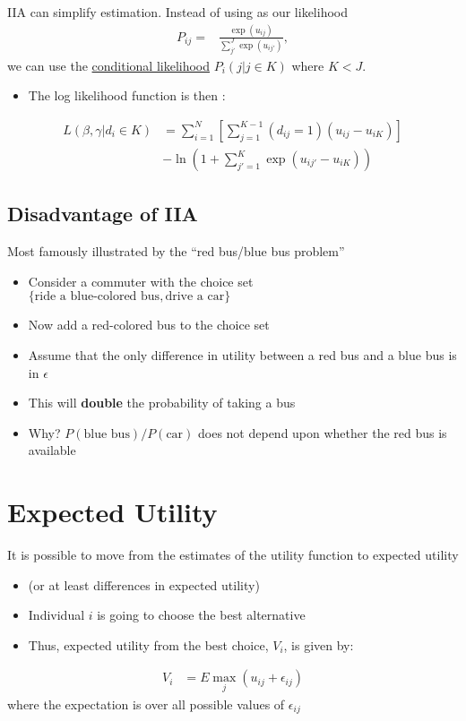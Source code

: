 \documentclass[11pt]{article}
\begin{document}
IIA can simplify estimation. Instead of using as our likelihood
\begin{align}
P_{ij}=&\frac{\exp(u_{ij})}{\sum_{j'}^J\exp(u_{ij'})},
\end{align}
we can use the \uline{conditional likelihood} \(P_i(j|j\in K)\) where \(K<J\).  

\begin{itemize}
\item The log likelihood function is then  \cite{beggGray1984}:
\end{itemize}
\begin{align*}
L(\beta,\gamma|d_i\in K)&=\sum_{i=1}^N\left[\sum_{j=1}^{K-1}(d_{ij}=1)(u_{ij}-u_{iK})\right]\\
&-\ln\left(1+\sum_{j'=1}^K\exp(u_{ij'}-u_{iK})\right)
\end{align*}

\subsection{Disadvantage of IIA}
\label{sec:org16e604e}

Most famously illustrated by the ``red bus/blue bus problem''

\begin{itemize}
\item Consider a commuter with the choice set \(\{\text{ride a blue-colored bus}, \text{drive a car}\}\)
\item Now add a red-colored bus to the choice set
\item Assume that the only difference in utility between a red bus and a blue bus is in \(\epsilon\)
\item This will \textbf{double} the probability of taking a bus
\item Why? \(P(\text{blue bus})/P(\text{car})\) does not depend upon whether the red bus is available
\end{itemize}

\section{Expected Utility}
\label{sec:orgd1ec7d3}

It is possible to move from the estimates of the utility function to expected utility 

\begin{itemize}
\item (or at least differences in expected utility)

\item Individual \(i\) is going to choose the best alternative

\item Thus, expected utility from the best choice, \(V_i\), is given by:
\end{itemize}
\begin{align*}
V_i&=E\max_{j}(u_{ij}+\epsilon_{ij})
\end{align*}
where the expectation is over all possible values of \(\epsilon _{ij}\)
\end{document}
